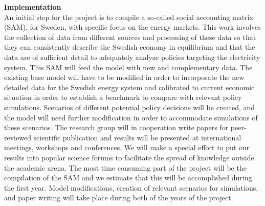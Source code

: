 \textbf{Implementation}\\
An initial step for the project is to compile a so-called social accounting matrix (SAM), for Sweden, with specific focus on the energy markets. This work involves the collection of data from different sources and processing of these data so that they can consistently describe the Swedish economy in equilibrium and that the data are of sufficient detail to adequately analyze policies targeting the electricity system. This SAM will feed the model with new and complementary data.
The existing base model will have to be modified in order to incorporate the new detailed data for the Swedish energy system and calibrated to current economic situation in order to establish a benchmark to compare with relevant policy simulations. Scenarios of different potential policy decisions will be created, and the model will need further modification in order to accommodate simulations of these scenarios.
The research group will in cooperation write papers for peer-reviewed scientific publication and results will be presented at international meetings, workshops and conferences. We will make a special effort to put our results into popular science forums to facilitate the spread of knowledge outside the academic arena.
The most time consuming part of the project will be the compilation of the SAM and we estimate that this will be accomplished during the first year. Model modifications, creation of relevant scenarios for simulations, and paper writing will take place during both of the years of the project.\\

